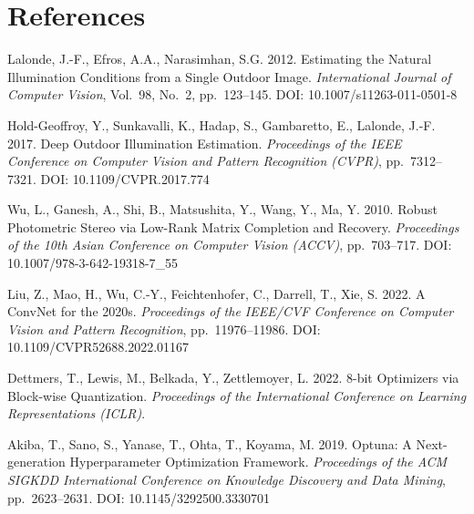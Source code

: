 \documentclass[9pt, a4paper, twocolumn]{article}
\begin{document}
\section*{References}
\begin{enumerate}[label={[\arabic*]}, leftmargin=*, itemsep=2pt, parsep=0pt, font=\small]
\begin{sloppypar}
\begin{enumerate}[label={[\arabic*]}, leftmargin=*, itemsep=2pt, parsep=0pt, font=\small]

\item Lalonde, J.-F., Efros, A.A., Narasimhan, S.G. 2012. Estimating the Natural Illumination Conditions from a Single Outdoor Image. \textit{International Journal of Computer Vision}, Vol.~98, No.~2, pp.~123--145. DOI: 10.1007/s11263-011-0501-8

\item Hold-Geoffroy, Y., Sunkavalli, K., Hadap, S., Gambaretto, E., Lalonde, J.-F. 2017. Deep Outdoor Illumination Estimation. \textit{Proceedings of the IEEE Conference on Computer Vision and Pattern Recognition (CVPR)}, pp.~7312--7321. DOI: 10.1109/CVPR.2017.774

\item Wu, L., Ganesh, A., Shi, B., Matsushita, Y., Wang, Y., Ma, Y. 2010. Robust Photometric Stereo via Low-Rank Matrix Completion and Recovery. \textit{Proceedings of the 10th Asian Conference on Computer Vision (ACCV)}, pp.~703--717. DOI: 10.1007/978-3-642-19318-7\_55

\item Liu, Z., Mao, H., Wu, C.-Y., Feichtenhofer, C., Darrell, T., Xie, S. 2022. A ConvNet for the 2020s. \textit{Proceedings of the IEEE/CVF Conference on Computer Vision and Pattern Recognition}, pp.~11976--11986. DOI: 10.1109/CVPR52688.2022.01167

\item Dettmers, T., Lewis, M., Belkada, Y., Zettlemoyer, L. 2022. 8-bit Optimizers via Block-wise Quantization. \textit{Proceedings of the International Conference on Learning Representations (ICLR)}.

\item Akiba, T., Sano, S., Yanase, T., Ohta, T., Koyama, M. 2019. Optuna: A Next-generation Hyperparameter Optimization Framework. \textit{Proceedings of the ACM SIGKDD International Conference on Knowledge Discovery and Data Mining}, pp.~2623--2631. DOI: 10.1145/3292500.3330701


\end{enumerate}
\end{sloppypar}
\end{enumerate}
\end{document}
